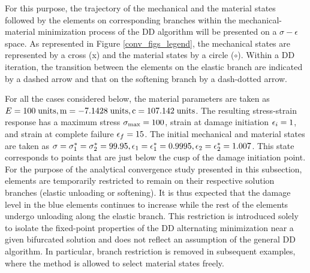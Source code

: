 \documentclass[10pt]{cas-sc}
\newenvironment{deletedblock}
{\begin{tcbstrikeout}\color{red}}
	{\end{tcbstrikeout}}
\begin{document}

\begin{deletedblock}
For this purpose, the trajectory of the mechanical and the material states followed by the elements on corresponding branches within the mechanical-material minimization process of the DD algorithm will be presented on a $\sigma-\epsilon$ space. As represented in Figure \ref{conv_figs_legend}, the mechanical states are represented by a cross (x) and the material states by a circle ($\circ$). Within a DD iteration, the transition between the elements on the elastic branch are indicated by a dashed arrow and that on the softening branch by a dash-dotted arrow.

For all the cases considered below, the material parameters are taken as $ E=100 \rm{\;units}, m=-7.1428\rm{\;units}, c=107.142\rm{\;units}$. The resulting stress-strain response has a maximum stress ${\sigma}_{\rm max} = 100$, strain at damage initiation ${\epsilon}_i=1$, and strain at complete failure ${\epsilon}_f=15$. The initial mechanical and material states are taken as ${\sigma}={\sigma}_1^*={\sigma}_2^*=99.95,{\epsilon}_1={\epsilon}_1^* =0.9995,{\epsilon}_2={\epsilon}_2^* =1.007$. This state corresponds to points that are just below the cusp of the damage initiation point. For the purpose of the analytical convergence study presented in this subsection, elements are temporarily restricted to remain on their respective solution branches (elastic unloading or softening). It is thus expected that the damage level in the blue elements continues to increase while the rest of the elements undergo unloading along the elastic branch. This restriction is introduced solely to isolate the fixed-point properties of the DD alternating minimization near a given bifurcated solution and does not reflect an assumption of the general DD algorithm. In particular, branch restriction is removed in subsequent examples, where the method is allowed to select material states freely. 

\end{deletedblock}
\end{document}
